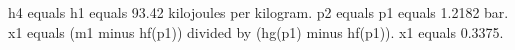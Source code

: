 h4 equals h1 equals 93.42 kilojoules per kilogram.  
p2 equals p1 equals 1.2182 bar.  
x1 equals (m1 minus hf(p1)) divided by (hg(p1) minus hf(p1)).  
x1 equals 0.3375.
